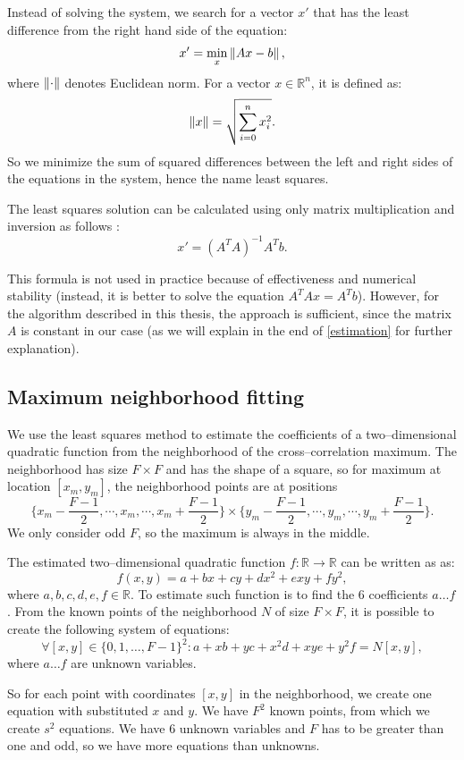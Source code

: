Instead of solving the system, we search for a vector $x'$ that has the least difference from the right hand side of the equation:
\[
x' = \min_x \left\lVert Ax - b\right\rVert,
\]
where $\left\lVert\cdot\right\rVert$ denotes Euclidean norm. For a vector $x \in \mathbb{R}^n$, it is defined as:
\[
\left\lVert x\right\rVert = \sqrt{\sum_{i=0}^{n} x_i^2}.
\]
So we minimize the sum of squared differences between the left and right sides of the equations in the system, hence the name least squares.

The least squares solution can be calculated using only matrix multiplication and inversion as follows \cite{anton2013elementary}:  
\[
x' = (A^TA)^{-1}A^Tb.
\]

This formula is not used in practice because of effectiveness and numerical stability (instead, it is better to solve the equation $A^TAx = A^Tb$). However, for the algorithm described in this thesis, the approach is sufficient, since the matrix $A$ is constant in our case (as we will explain in the end of \cref{estimation} for further explanation).

\subsection{Maximum neighborhood fitting}

We use the least squares method to estimate the coefficients of a two--dimensional quadratic function from the neighborhood of the cross--cor\-re\-la\-tion maximum. The neighborhood has size $F \times F$ and has the shape of a square, so for maximum at location $[x_m, y_m]$, the neighborhood points are at positions 
\[
\{x_m - \frac{F-1}{2}, \cdots, x_m, \cdots, x_m + \frac{F-1}{2}\} \times \{y_m - \frac{F-1}{2}, \cdots, y_m, \cdots, y_m + \frac{F-1}{2}\}.
\]
We only consider odd $F$, so the maximum is always in the middle.

The estimated two--dimensional quadratic function $f:\mathbb{R} \rightarrow \mathbb{R}$ can be written as as:
\[
f(x,y) = a + bx + cy + dx^2 + exy + fy^2,
\]
where $a, b, c, d, e, f \in \mathbb{R}$. To estimate such function is to find the 6 coefficients $a \dots f$. From the known points of the neighborhood $N$ of size $F \times F$, it is possible to create the following system of equations:
\[
\forall [x,y] \in \{0,1,\dots , F-1\}^2 : a + xb + yc + x^2d + xye + y^2f = N[x,y],
\]
where $a \dots f$ are unknown variables.

So for each point with coordinates $[x,y]$ in the neighborhood, we create one equation with substituted $x$ and $y$. We have $F^2$ known points, from which we create $s^2$ equations. We have 6 unknown variables and $F$ has to be greater than one and odd, so we have more equations than unknowns. 

